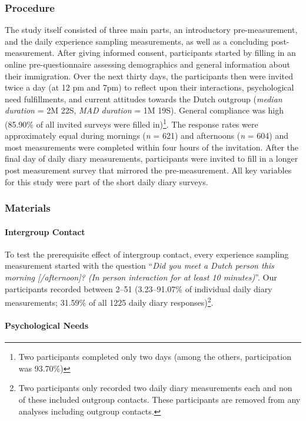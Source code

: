 \subsubsection{Procedure}

The study itself consisted of three main parts, an introductory
pre-measurement, and the daily experience sampling measurements, as well
as a concluding post-measurement. After giving informed consent,
participants started by filling in an online pre-questionnaire assessing
demographics and general information about their immigration. Over the
next thirty days, the participants then were invited twice a day (at 12
pm and 7pm) to reflect upon their interactions, psychological need
fulfillments, and current attitudes towards the Dutch outgroup
(\textit{median duration} = 2M 22S, \textit{MAD duration} = 1M 19S).
General compliance was high (85.90\% of all invited surveys were filled
in)\footnote{Two participants completed only two days (among the others, participation was 93.70\%)}.
The response rates were approximately equal during mornings (\textit{n}
= 621) and afternoons (\textit{n} = 604) and most measurements were
completed within four hours of the invitation. After the final day of
daily diary measurements, participants were invited to fill in a longer
post measurement survey that mirrored the pre-measurement. All key
variables for this study were part of the short daily diary surveys.

\subsubsection{Materials}

\paragraph{Intergroup Contact}

To test the prerequisite effect of intergroup contact, every experience
sampling measurement started with the question
``\textit{Did you meet a Dutch person this morning [/afternoon]? (In person interaction for at least 10 minutes)}''.
Our participants recorded between 2--51 (3.23--91.07\% of individual
daily diary measurements; 31.59\% of all 1225 daily diary
responses)\footnote{Two participants only recorded two daily diary measurements each and non of these included outgroup contacts. These participants are removed from any analyses including outgroup contacts.}.

\paragraph{Psychological Needs}


